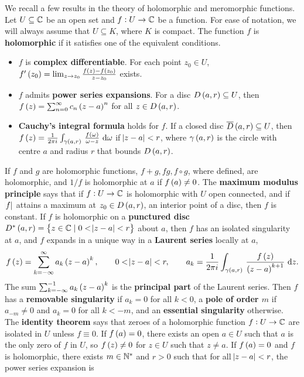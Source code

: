 We recall a few results in the theory of holomorphic and meromorphic functions. Let $ U \subseteq \mathbb{C} $ be an open set and $ f : U \to \mathbb{C} $ be a function. For ease of notation, we will always assume that $ U \subseteq K $, where $ K $ is compact. The function $ f $ is \textbf{holomorphic} if it satisfies one of the equivalent conditions.
\begin{itemize}
\item $ f $ is \textbf{complex differentiable}. For each point $ z_0 \in U $, $ f'\br{z_0} = \lim_{z \to z_0} \tfrac{f\br{z} - f\br{z_0}}{z - z_0} $ exists.
\item $ f $ admits \textbf{power series expansions}. For a disc $ D\br{a, r} \subseteq U $, then $ f\br{z} = \sum_{n = 0}^\infty c_n\br{z - a}^n $ for all $ z \in D\br{a, r} $.
\item \textbf{Cauchy's integral formula} holds for $ f $. If a closed disc $ \overline{D}\br{a, r} \subseteq U $, then $ f\br{z} = \tfrac{1}{2\pi i}\intd{\gamma\br{a, r}}{}{\tfrac{f\br{\omega}}{\omega - z}}{\omega} $ if $ \abs{z - a} < r $, where $ \gamma\br{a, r} $ is the circle with centre $ a $ and radius $ r $ that bounds $ D\br{a, r} $.
\end{itemize}
If $ f $ and $ g $ are holomorphic functions, $ f + g, fg, f \circ g $, where defined, are holomorphic, and $ 1 / f $ is holomorphic at $ a $ if $ f\br{a} \ne 0 $. The \textbf{maximum modulus principle} says that if $ f : U \to \mathbb{C} $ is holomorphic with $ U $ open connected, and if $ \abs{f} $ attains a maximum at $ z_0 \in D\br{a, r} $, an interior point of a disc, then $ f $ is constant. If $ f $ is holomorphic on a \textbf{punctured disc} $ D^*\br{a, r} = \cbr{z \in \C \mid 0 < \abs{z - a} < r} $ about $ a $, then $ f $ has an isolated singularity at $ a $, and $ f $ expands in a unique way in a \textbf{Laurent series} locally at $ a $,
$$ f\br{z} = \sum_{k = -\infty}^\infty a_k\br{z - a}^k, \qquad 0 < \abs{z - a} < r, \qquad a_k = \dfrac{1}{2\pi i} \intd{\gamma\br{a, r}}{}{\dfrac{f\br{z}}{\br{z - a}^{k + 1}}}{z}. $$
The sum $ \sum_{k = -\infty}^{-1} a_k\br{z - a}^k $ is the \textbf{principal part} of the Laurent series. Then $ f $ has a \textbf{removable singularity} if $ a_k = 0 $ for all $ k < 0 $, a \textbf{pole of order $ m $} if $ a_{-m} \ne 0 $ and $ a_k = 0 $ for all $ k < -m $, and an \textbf{essential singularity} otherwise. The \textbf{identity theorem} says that zeroes of a holomorphic function $ f : U \to \mathbb{C} $ are isolated in $ U $ unless $ f \equiv 0 $. If $ f\br{a} = 0 $, there exists an open $ a \in U $ such that $ a $ is the only zero of $ f $ in $ U $, so $ f\br{z} \ne 0 $ for $ z \in U $ such that $ z \ne a $. If $ f\br{a} = 0 $ and $ f $ is holomorphic, there exists $ m \in \mathbb{N}^* $ and $ r > 0 $ such that for all $ \abs{z - a} < r $, the power series expansion is
